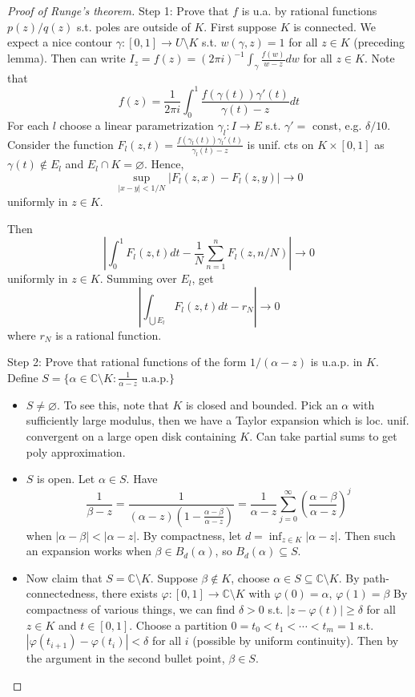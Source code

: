 \documentclass{article}
\theoremstyle{definition}
\theoremstyle{remark}
\theoremstyle{plain}
\newcommand{\CC}{\mathbb{C}}
\begin{document}
\begin{proof}[Proof of Runge's theorem]
    Step 1: Prove that $f$ is u.a. by rational functions $p(z)/q(z)$ s.t. poles are outside of $K$. First suppose $K$ is connected. We expect a nice contour $\gamma:[0,1]\to U\setminus K$ s.t. $w(\gamma,z)=1$ for all $z\in K$ (preceding lemma). Then can write $I_z=f(z)=(2\pi i)^{-1}\int_\gamma\frac{f(w)}{w-z}dw$ for all $z\in K$. Note that
    \[f(z)=\dfrac{1}{2\pi i}\int_0^1\dfrac{f(\gamma(t))\gamma'(t)}{\gamma(t)-z}dt\]
    For each $l$ choose a linear parametrization $\gamma_l:I\to E$ s.t. $\gamma'=$ const, e.g. $\delta/10$. Consider
    the function $F_l(z,t)=\frac{f(\gamma_l(t))\gamma_l'(t)}{\gamma_l(t)-z}$ is unif. cts on $K\times[0,1]$ as $\gamma(t)\notin E_l$ and $E_l\cap K=\varnothing$. Hence,
    \[\sup_{|x-y|<1/N}|F_l(z,x)-F_l(z,y)|\to 0\]
    uniformly in $z\in K$.

    Then \[\left|\int_0^1 F_l(z,t)dt-\frac1N\sum_{n=1}^nF_l(z,n/N)\right|\to 0\]
    uniformly in $z\in K$. Summing over $E_l$, get 
    \[\left|\int_{\bigcup E_l} F_l(z,t)dt-r_N\right|\to 0\] where $r_N$ is a rational function.

    Step 2: Prove that rational functions of the form $1/(\alpha-z)$ is u.a.p. in $K$. Define $S=\{\alpha\in\CC\setminus K:\frac{1}{\alpha-z}\text{ u.a.p.}\}$
    \begin{itemize}
        \item $S\neq\varnothing$. To see this, note that $K$ is closed and bounded. Pick an $\alpha$ with sufficiently large modulus, then we have a Taylor expansion which is loc. unif. convergent on a large open disk containing $K$. Can take partial sums to get poly approximation.
        \item $S$ is open. Let $\alpha\in S$. Have
        \[\frac{1}{\beta-z}=\frac{1}{(\alpha-z)(1-\frac{\alpha-\beta}{\alpha-z})}=\frac{1}{\alpha-z}\sum_{j=0}^\infty\left(\frac{\alpha-\beta}{\alpha-z}\right)^j\] when $|\alpha-\beta|<|\alpha-z|$. By compactness, let $d=\inf_{z\in K}|\alpha-z|$. Then such an expansion works when $\beta\in B_d(\alpha)$, so $B_d(\alpha)\subseteq S$.
        \item Now claim that $S=\CC\setminus K$. Suppose $\beta\not\in K$, choose $\alpha\in S\subseteq \CC\setminus K$. By path-connectedness, there exists $\varphi:[0,1]\to \CC\setminus K$ with $\varphi(0)=\alpha$, $\varphi(1)=\beta$ By compactness of various things, we can find $\delta>0$ s.t. $|z-\varphi(t)|\ge\delta$ for all $z\in K$ and $t\in[0,1]$. Choose a partition $0=t_0<t_1<\cdots< t_m=1$ s.t. $|\varphi(t_{i+1})-\varphi(t_i)|<\delta$ for all $i$ (possible by uniform continuity). Then by the argument in the second bullet point, $\beta\in S$. 
    \end{itemize}
\end{proof}
\end{document}

